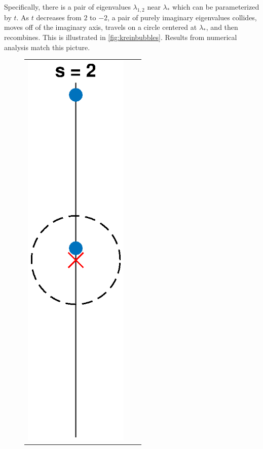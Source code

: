 \documentclass[thesis.tex]{subfiles}
\begin{document}
Specifically, there is a pair of eigenvalues $\lambda_{1,2}$ near $\lambda_*$ which can be parameterized by $t$. As $t$ decreases from $2$ to $-2$, a pair of purely imaginary eigenvalues collides, moves off of the imaginary axis, travels on a circle centered at $\lambda_*$, and then recombines. This is illustrated in \cref{fig:kreinbubbles}. Results from numerical analysis match this picture.
\begin{figure}[H]
\begin{center}
\begin{tabular}{ccc}
\includegraphics[width=5cm]{images/kreinbubbles/bubble2R} &

\end{tabular}
\end{center}
\end{figure}
\end{document}
